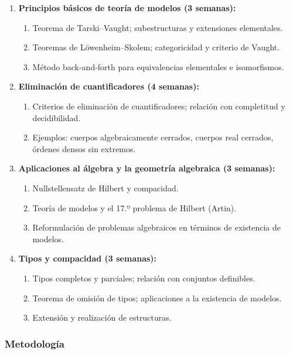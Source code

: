 \begin{refsection}
\begin{enumerate}
\item \textbf{Principios básicos de teoría de modelos (3 semanas):}
\begin{enumerate}
    \item Teorema de Tarski--Vaught; subestructuras y extensiones elementales.
    \item Teoremas de Löwenheim--Skolem; categoricidad y criterio de Vaught.
    \item Método back-and-forth para equivalencias elementales e isomorfismos.
\end{enumerate}

\item \textbf{Eliminación de cuantificadores (4 semanas):}
\begin{enumerate}
    \item Criterios de eliminación de cuantificadores; relación con completitud y decidibilidad.
    \item Ejemplos: cuerpos algebraicamente cerrados, cuerpos real cerrados, órdenes densos sin extremos.
\end{enumerate}

\item \textbf{Aplicaciones al álgebra y la geometría algebraica (3 semanas):}
\begin{enumerate}
    \item Nullstellensatz de Hilbert y compacidad.
    \item Teoría de modelos y el 17.º problema de Hilbert (Artin).
    \item Reformulación de problemas algebraicos en términos de existencia de modelos.
\end{enumerate}

\item \textbf{Tipos y compacidad (3 semanas):}
\begin{enumerate}
    \item Tipos completos y parciales; relación con conjuntos definibles.
    \item Teorema de omisión de tipos; aplicaciones a la existencia de modelos.
    \item Extensión y realización de estructuras.
\end{enumerate}

\end{enumerate}

\subsubsection*{Metodología}


\end{refsection}
